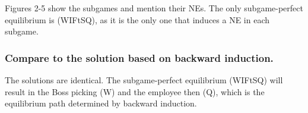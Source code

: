 Figures 2-5 show the subgames and mention their NEs. The only subgame-perfect equilibrium is (WIFtSQ), as it is the
only one that induces a NE in each subgame.

\subsubsection{Compare to the solution based on backward induction.}
The solutions are identical. The subgame-perfect equilibrium (WIFtSQ) will result in the Boss picking (W) and the
employee then (Q), which is the equilibrium path determined by backward induction.